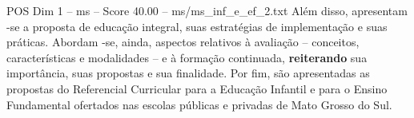 \begin{textsample}{POS Dim 1 – ms – Score 40.00 – ms/ms\_inf\_e\_ef\_2.txt}
Além disso, apresentam -se a proposta de educação integral, suas estratégias de implementação e suas práticas.
Abordam -se, ainda, aspectos relativos à avaliação – conceitos, características e modalidades – e à formação continuada, \textbf{reiterando} sua importância, suas propostas e sua finalidade.
Por fim, são apresentadas as propostas do Referencial Curricular para a Educação Infantil e para o Ensino Fundamental ofertados nas escolas públicas e privadas de Mato Grosso do Sul.

\end{textsample}

